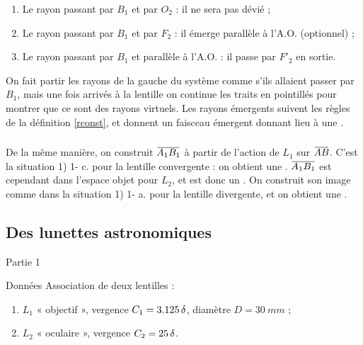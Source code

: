 \documentclass[10pt,a5paper,notitlepage]{book}
\begin{document}
\begin{enumerate}
    \item Le rayon passant par $B_1$ et par $O_2$ : il ne sera pas dévié ;
    \item Le rayon passant par $B_1$ et par $F_2$ : il émerge parallèle à l'A.O.
        (optionnel) ;
    \item Le rayon passant par $B_1$ et parallèle à l'A.O. : il passe par $F'_2$
        en sortie.
\end{enumerate}

On fait partir les rayons de la gauche du système comme s'ils allaient passer
par $B_1$, mais une fois arrivés à la lentille on continue les traits en
pointillés pour montrer que ce sont des rayons virtuels. Les rayons émergents
suivent les règles de la définition \ref{rconst}, et donnent un faisceau
émergent  donnant lieu à une .

\subsubsection{}
De la même manière, on construit $\ABa$ à partir de l'action de $L_1$ sur $\ABb$.
C'est la situation 1) 1- c. pour la lentille convergente : on obtient une
 . $\ABa$ est cependant dans l'espace
objet pour $L_2$, et est donc un  . On
construit son image comme dans la situation 1) 1- a. pour la lentille
divergente, et on obtient une .

\subsection{Des lunettes astronomiques}
\begin{center}
    \huge Partie 1
\end{center}

\pagebreak

\begin{NCdefi}{Données}
    Association de deux lentilles :
    \begin{enumerate}
        \item $L_1$ « objectif », vergence $C_1 = \SI{3.125}{\delta}$, diamètre $D
            = \SI{30}{mm}$ ;
        \item $L_2$ « oculaire », vergence $C_2 = \SI{25}{\delta}$.
    \end{enumerate}
\end{NCdefi}

\subsubsection{}
\end{document}
